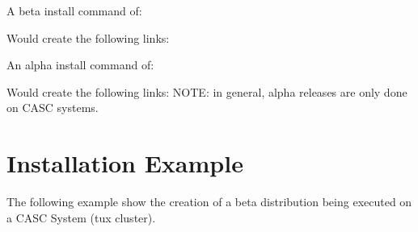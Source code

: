 \begin{enumerate}
   A beta install command of:\linebreak
   \linebreak

   Would create the following links:\linebreak
   \linebreak
   \linebreak

   An alpha install command of:\linebreak
   \linebreak

   Would create the following links:\linebreak
   \linebreak
   NOTE: in general, alpha releases are only done on CASC systems.

\end{enumerate}

\section{Installation Example}
\label{Installation Example}

The following example show the creation of a beta distribution being executed on 
a CASC System (tux cluster).

